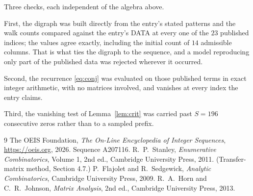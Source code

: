 \documentclass[11pt,a4paper]{article}
\theoremstyle{plain}
\theoremstyle{definition}
\begin{document}
Three checks, each independent of the algebra above.

First, the digraph was built directly from the entry's stated patterns and the walk counts
compared against the entry's DATA at every one of the $23$ published indices; the
values agree exactly, including the initial count of $14$ admissible columns. That is
what ties the digraph to the sequence, and a model reproducing only part of the published
data was rejected wherever it occurred.

Second, the recurrence \eqref{eq:conj} was evaluated on those published terms in exact
integer arithmetic, with no matrices involved, and vanishes at every index the entry claims.

Third, the vanishing test of Lemma~\ref{lem:crit} was carried past $S=196$ consecutive
zeros rather than to a sampled prefix.

\begin{thebibliography}{9}
 The OEIS Foundation, \emph{The On-Line Encyclopedia of Integer
Sequences}, \url{https://oeis.org}, 2026. Sequence A207116.
 R.~P.~Stanley, \emph{Enumerative Combinatorics}, Volume 1, 2nd ed.,
Cambridge University Press, 2011. (Transfer-matrix method, Section 4.7.)
 P.~Flajolet and R.~Sedgewick, \emph{Analytic Combinatorics}, Cambridge
University Press, 2009.
 R.~A.~Horn and C.~R.~Johnson, \emph{Matrix Analysis}, 2nd ed., Cambridge
University Press, 2013.
\end{thebibliography}
\end{document}
